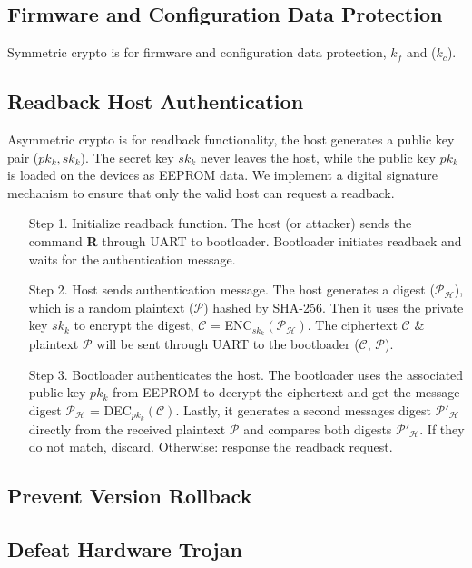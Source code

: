 \documentclass[11pt,oneside,onecolumn,letterpaper]{article}
\begin{document}
\subsection{Firmware and Configuration Data Protection}
Symmetric crypto is for firmware and configuration data protection, $k_f$ and ($k_c$).

\subsection{Readback Host Authentication}
Asymmetric crypto is for readback functionality, the host generates a public key pair ($pk_k, sk_k$).
The secret key $sk_k$ never leaves the host, while the public key $pk_k$ is loaded on the devices as EEPROM data.
We implement a digital signature mechanism to ensure that only the valid host can request a readback.
\begin{itemize}
  \item[Step 1.] Initialize readback function. 
  The host (or attacker) sends the command \textbf{R} through UART to bootloader.
  Bootloader initiates readback and waits for the authentication message.  
  \item[Step 2.] Host sends authentication message.
  The host generates a digest ($\mathcal{P_H}$), which is a random plaintext ($\mathcal{P}$) hashed by SHA-256.
  Then it uses the private key $sk_k$ to encrypt the digest, $\mathcal{C}$ = ENC$_{sk_k}(\mathcal{P_H})$.
  The ciphertext $\mathcal{C}$ \& plaintext $\mathcal{P}$ will be sent through UART to the bootloader ($\mathcal{C}$, $\mathcal{P}$).
  \item[Step 3.] Bootloader authenticates the host.
  The bootloader uses the associated public key $pk_k$ from EEPROM to decrypt the ciphertext and get the message digest $\mathcal{P_H}$ = DEC$_{pk_k}(\mathcal{C})$.
  Lastly, it generates a second messages digest $\mathcal{P'_H}$ directly from the received plaintext $\mathcal{P}$ and compares both digests $\mathcal{P'_H}$.
  If they do not match, discard.
  Otherwise: response the readback request.
\end{itemize}

\subsection{Prevent Version Rollback}
  
\subsection{Defeat Hardware Trojan}
\end{document}
